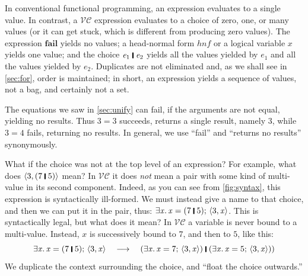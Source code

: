 \documentclass[acmsmall,review,dvipsnames]{acmart}
\newcommand{\Varid}[1]{\mathit{#1}}
\newcommand{\versecalc}{$\mathcal{VC}$}
\newcommand{\movesto}{\longrightarrow}
\begin{document}
In conventional functional programming, an expression evaluates to a single value.
In contrast, a \versecalc{} expression evaluates to a choice of zero, one, or many values (or it can get stuck, which is different from producing zero values).
The expression \ensuremath{\textbf{fail}} yields no values; a head-normal form \ensuremath{\mathit{hnf}} or a logical variable \ensuremath{\Varid{x}} yields one value;
and the choice \ensuremath{\Varid{e}_{\mathrm{1}}\;\rule[-0.3mm]{0.5mm}{2.5mm}\;\Varid{e}_{\mathrm{2}}} yields all the values
yielded by \ensuremath{\Varid{e}_{\mathrm{1}}} and all the values yielded by \ensuremath{\Varid{e}_{\mathrm{2}}}.
Duplicates are not eliminated and, as we shall see in \cref{sec:for}, order is maintained; in short,
an expression yields a sequence of values, not a bag, and certainly not a set.

The equations we saw in \cref{sec:unify} can fail, if the arguments
are not equal, yielding no results.  Thus \ensuremath{\mathrm{3}\mathrel{=}\mathrm{3}} succeeds, returns a single result, namely \ensuremath{\mathrm{3}},
while \ensuremath{\mathrm{3}\mathrel{=}\mathrm{4}} fails, returning no results.  In general, we use ``fail''
and ``returns no results'' synonymously.

What if the choice was not at the top level of an expression?  For example,
what does \ensuremath{\langle{}\mathrm{3},(\mathrm{7}\;\rule[-0.3mm]{0.5mm}{2.5mm}\;\mathrm{5})\rangle} mean?
In \versecalc{} it does \emph{not} mean a pair with some kind of multi-value in its second component.
Indeed, as you can see from \cref{fig:syntax}, this expression is syntactically ill-formed.
We must instead give a name to that choice, and then we can put it in the pair, thus: \ensuremath{\exists\Varid{x}.\,\Varid{x}\mathrel{=}(\mathrm{7}\;\rule[-0.3mm]{0.5mm}{2.5mm}\;\mathrm{5});\,\langle{}\mathrm{3},\Varid{x}\rangle}.
This is syntactically legal, but what does it mean?  In \versecalc{} a variable is never bound to a multi-value.
Instead, \ensuremath{\Varid{x}} is successively bound to \ensuremath{\mathrm{7}}, and then to \ensuremath{\mathrm{5}}, like this:
$$
\ensuremath{\exists\Varid{x}.\,\Varid{x}\mathrel{=}(\mathrm{7}\;\rule[-0.3mm]{0.5mm}{2.5mm}\;\mathrm{5});\,\langle{}\mathrm{3},\Varid{x}\rangle} \quad \movesto \quad \ensuremath{(\exists\Varid{x}.\,\Varid{x}\mathrel{=}\mathrm{7};\,\langle{}\mathrm{3},\Varid{x}\rangle)\;\rule[-0.3mm]{0.5mm}{2.5mm}\;(\exists\Varid{x}.\,\Varid{x}\mathrel{=}\mathrm{5};\,\langle{}\mathrm{3},\Varid{x}\rangle))}
$$
We duplicate the context surrounding the choice, and ``float the choice outwards.''
\end{document}
